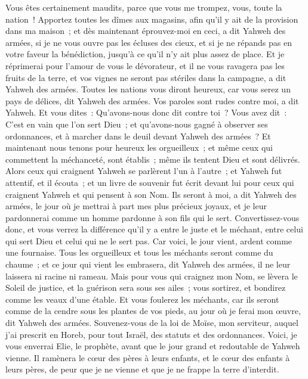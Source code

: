 \begin{multicols}{2}
Vous êtes certainement maudits, parce que vous me trompez, vous, toute la nation~!
Apportez toutes les dîmes aux magasins, afin qu'il y ait de la provision dans ma maison~; et dès maintenant éprouvez-moi en ceci, a dit Yahweh des armées, si je ne vous ouvre pas les écluses des cieux, et si je ne répands pas en votre faveur la bénédiction, jusqu'à ce qu'il n'y ait plus assez de place.
Et je réprimerai pour l'amour de vous le dévorateur, et il ne vous ravagera pas les fruits de la terre, et vos vignes ne seront pas stériles dans la campagne, a dit Yahweh des armées.
Toutes les nations vous diront heureux, car vous serez un pays de délices, dit Yahweh des armées.
Vos paroles sont rudes contre moi, a dit Yahweh. Et vous dites~: Qu'avons-nous donc dit contre toi~?
Vous avez dit~: C'est en vain que l'on sert Dieu~; et qu'avons-nous gagné à observer ses ordonnances, et à marcher dans le deuil devant Yahweh des armées~?
Et maintenant nous tenons pour heureux les orgueilleux~; et même ceux qui commettent la méchanceté, sont établis~; même ils tentent Dieu et sont délivrés.
Alors ceux qui craignent Yahweh se parlèrent l'un à l'autre~; et Yahweh fut attentif, et il écouta~; et un livre de souvenir fut écrit devant lui pour ceux qui craignent Yahweh et qui pensent à son Nom.
Ils seront à moi, a dit Yahweh des armées, le jour où je mettrai à part mes plus précieux joyaux, et je leur pardonnerai comme un homme pardonne à son fils qui le sert.
Convertissez-vous donc, et vous verrez la différence qu'il y a entre le juste et le méchant, entre celui qui sert Dieu et celui qui ne le sert pas.
\VerseOne{}Car voici, le jour vient, ardent comme une fournaise. Tous les orgueilleux et tous les méchants seront comme du chaume~; et ce jour qui vient les embrasera, dit Yahweh des armées, il ne leur laissera ni racine ni rameau.
Mais pour vous qui craignez mon Nom, se lèvera le Soleil de justice, et la guérison sera sous ses ailes~; vous sortirez, et bondirez comme les veaux d'une étable.
Et vous foulerez les méchants, car ils seront comme de la cendre sous les plantes de vos pieds, au jour où je ferai mon œuvre, dit Yahweh des armées.
Souvenez-vous de la loi de Moïse, mon serviteur, auquel j'ai prescrit en Horeb, pour tout Israël, des statuts et des ordonnances.
Voici, je vous enverrai Elie, le prophète, avant que le jour grand et redoutable de Yahweh vienne.
Il ramènera le cœur des pères à leurs enfants, et le cœur des enfants à leurs pères, de peur que je ne vienne et que je ne frappe la terre d'interdit.
\PPE{}
\end{multicols}
